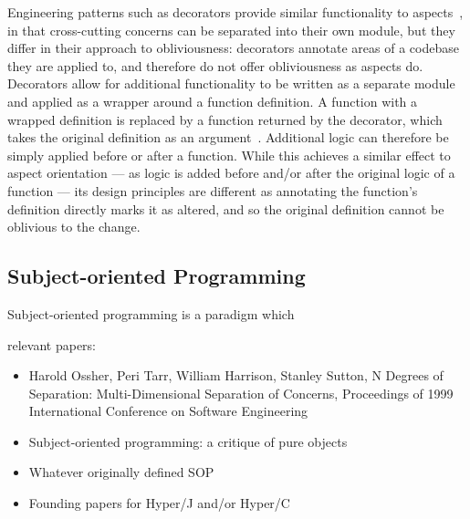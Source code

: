 Engineering patterns such as decorators provide similar functionality to
aspects~\cite{friesel2017annotations}, in that cross-cutting concerns can be
separated into their own module, but they differ in their approach to
obliviousness: decorators annotate areas of a codebase they are applied to, and
therefore do not offer obliviousness as aspects do. Decorators allow for
additional functionality to be written as a separate module and applied as a
wrapper around a function definition. A function with a wrapped
definition is replaced by a function returned by the decorator, which takes the
original definition as an argument~\citep{gof_design_patterns}. Additional logic
can therefore be simply applied before or after a function. While this achieves
a similar effect to aspect orientation --- as logic is added before and/or after
the original logic of a function --- its design principles are different as
annotating the function's definition directly marks it as altered, and so the
original definition cannot be oblivious to the change.


\subsection{Subject-oriented Programming}

Subject-oriented programming is a paradigm which  

relevant papers:

\begin{itemize}
\item Harold Ossher, Peri Tarr, William Harrison, Stanley Sutton, N Degrees of
  Separation: Multi-Dimensional Separation of Concerns, Proceedings of 1999
  International Conference on Software Engineering
\item Subject-oriented programming: a critique of pure objects
\item Whatever originally defined SOP
  \item Founding papers for Hyper/J and/or Hyper/C
  \end{itemize}



